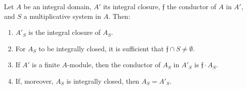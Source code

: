 Let $A$ be an integral domain, $A'$ its integral closure, $\mathfrak{f}$ the conductor of $A$ in $A'$, and $S$ a multiplicative system in $A$. Then:
\begin{enumerate}
\item $A'_S$ is the integral closure of $A_S$.
\item For $A_S$ to be integrally closed, it is sufficient that $\mathfrak{f} \cap S \neq \emptyset$.
\item If $A'$ is a finite $A$-module, then the conductor of $A_S$ in $A'_S$ is $\mathfrak{f} \cdot A_S$.
\item If, moreover, $A_S$ is integrally closed, then $A_S = A'_S$.
\end{enumerate}
